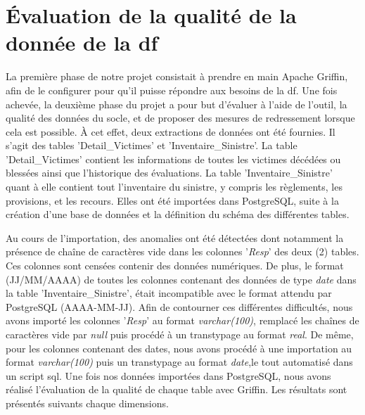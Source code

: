  
\section{Évaluation de la qualité de la donnée de la \acrlong{df}}
La premi\`ere phase de notre projet consistait \`a prendre en main Apache Griffin, afin de le configurer pour qu'il puisse r\'epondre aux besoins de la \acrshort{df}. Une fois achev\'ee,  la deuxi\`eme phase du projet a pour but d'\'evaluer \`a l'aide de l'outil, la qualit\'e des donn\'ees du socle, et de proposer des mesures de redressement lorsque cela est possible. \`A cet effet, deux extractions de donn\'ees ont \'et\'e fournies. Il s'agit des tables 'Detail\_Victimes' et 'Inventaire\_Sinistre'. La table 'Detail\_Victimes' contient les informations de toutes les victimes décédées ou blessées ainsi que l'historique des évaluations. La table 'Inventaire\_Sinistre' quant \`a elle contient tout l'inventaire du sinistre, y compris les règlements, les provisions, et les recours. Elles ont \'et\'e import\'ees dans PostgreSQL, suite \`a la cr\'eation d'une base de donn\'ees et la d\'efinition du sch\'ema des diff\'erentes tables. 


Au cours de l'importation, des anomalies ont \'et\'e d\'etect\'ees dont notamment la pr\'esence de chaîne de caract\`eres vide dans les colonnes '\emph{Resp}' des deux (2) tables. Ces colonnes sont cens\'ees contenir des donn\'ees num\'eriques. De plus, le format (JJ/MM/AAAA) de toutes les colonnes contenant des donn\'ees de type \textit{date} dans la table 'Inventaire\_Sinistre', \'etait incompatible avec le format attendu par PostgreSQL (AAAA-MM-JJ). Afin de contourner ces diff\'erentes difficult\'es, nous avons import\'e les colonnes '\emph{Resp}' au format \textit{varchar(100)}, remplac\'e les chaînes de caract\`eres vide par \textit{null} puis proc\'ed\'e \`a un transtypage au format \textit{real}. De m\^eme, pour les colonnes contenant des dates, nous avons proc\'ed\'e \`a une importation au format \textit{varchar(100)} puis un transtypage au format \textit{date},le tout automatis\'e dans un script \acrshort{sql}. Une fois nos donn\'ees import\'ees dans PostgreSQL, nous avons r\'ealis\'e l'\'evaluation de la qualit\'e  de chaque table avec Griffin. Les r\'esultats sont pr\'esent\'es suivants chaque dimensions.


